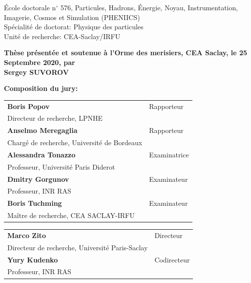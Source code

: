 \documentclass[../main.tex]{subfiles}
\begin{document}
\vspace{15mm}

École doctorale n$^{\circ}$ 576, Particules, Hadrons, Énergie, Noyau, Instrumentation,
Imagerie, Cosmos et Simulation (PHENIICS)\\
\small Spécialité de doctorat: Physique des particules\\
\footnotesize Unité de recherche: CEA-Saclay/IRFU\\
\vspace{15mm}

\textbf{Thèse présentée et soutenue à l'Orme des merisiers, CEA Saclay, le 25 Septembre 2020, par}\\
\bigskip
\Large {\color{Prune} \textbf{Sergey SUVOROV}}


\vspace{\fill} %

\flushleft \small \textbf{Composition du jury:}
\bigskip



\scriptsize
\begin{tabular}{|p{8cm}l}
\textbf{Boris Popov} &   Rapporteur\\
Directeur de recherche, LPNHE & \\
\textbf{Anselmo Meregaglia} &  Rapporteur \\
Chargé de recherche, Université de Bordeaux  &   \\

\textbf{Alessandra Tonazzo} &  Examinatrice \\
Professeur, Université Paris Diderot   &   \\
\textbf{Dmitry Gorgunov} &  Examinateur \\
Professeur, INR RAS   &   \\
\textbf{Boris Tuchming} &  Examinateur \\
Maître de recherche, CEA SACLAY-IRFU   &   \\

\end{tabular}

\medskip
\begin{tabular}{|p{8cm}l}\arrayrulecolor{white}
\textbf{Marco Zito} &   Directeur\\
Directeur de recherche, Université Paris-Saclay & \\
\textbf{Yury Kudenko} &   Codirecteur\\
Professeur, INR RAS  &   \\


\end{tabular}
\end{document}

